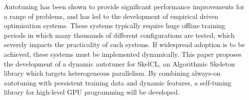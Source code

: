 Autotuning has been shown to provide significant performance
improvements for a range of problems, and has led to the development
of empirical driven optimisation systems. These systems typically
require huge offline training periods in which many thousands of
different configurations are tested, which severely impacts the
practicality of such systems. If widespread adoption is to be
achieved, these systems must be implemented dynamically. This paper
proposes the development of a dynamic autotuner for SkelCL, an
Algorithmic Skeleton library which targets heterogeneous
parallelism. By combining always-on autotuning with persistent
training data and dynamic features, a self-tuning library for
high-level GPU programming will be developed.
